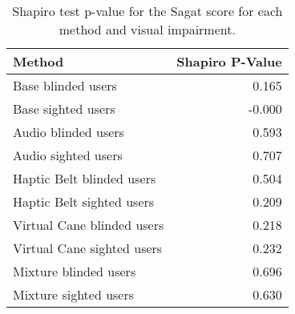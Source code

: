 
\begin{table}[!htb]
\centering
\caption{Shapiro test p-value for the Sagat score for each method and visual impairment.}
\label{tab:shapiro_sagat_score}
\begin{tabular}{lr}
\toprule
                    Method &  Shapiro P-Value \\
\midrule
        Base blinded users &            0.165 \\
        Base sighted users &           -0.000 \\
       Audio blinded users &            0.593 \\
       Audio sighted users &            0.707 \\
 Haptic Belt blinded users &            0.504 \\
 Haptic Belt sighted users &            0.209 \\
Virtual Cane blinded users &            0.218 \\
Virtual Cane sighted users &            0.232 \\
     Mixture blinded users &            0.696 \\
     Mixture sighted users &            0.630 \\
\bottomrule
\end{tabular}
\end{table}


